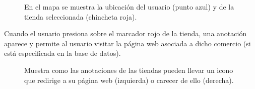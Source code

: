 \begin{figure}[H]
	\centering
	\caption{En el mapa se muestra la ubicación del usuario (punto azul) y de la tienda seleccionada (chincheta roja).}
	\label{fig:mapa}
\end{figure}

Cuando el usuario presiona sobre el marcador rojo de la tienda, una anotación aparece y permite al usuario visitar la página web asociada a dicho comercio (si está especificada en la base de datos).

\begin{figure}[H]
	\centering
	\caption{Muestra como las anotaciones de las tiendas pueden llevar un icono que redirige a su página web (izquierda) o carecer de ello (derecha).}
	\label{fig:mapa-anotaciones}
\end{figure}


